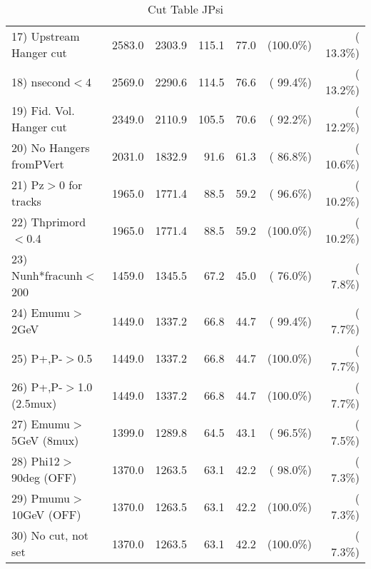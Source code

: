 \begin{table}[h!]
\begin{tabular}{||l||r|r|r|r|r|r||}
 17) Upstream Hanger cut  &       2583.0 &       2303.9 &        115.1 &         77.0 & (100.0\%) & ( 13.3\%) \\
 18) nsecond$<$4          &       2569.0 &       2290.6 &        114.5 &         76.6 & ( 99.4\%) & ( 13.2\%) \\
 19) Fid. Vol. Hanger cut &       2349.0 &       2110.9 &        105.5 &         70.6 & ( 92.2\%) & ( 12.2\%) \\
 20) No Hangers fromPVert &       2031.0 &       1832.9 &         91.6 &         61.3 & ( 86.8\%) & ( 10.6\%) \\
 21) Pz$>$0 for tracks    &       1965.0 &       1771.4 &         88.5 &         59.2 & ( 96.6\%) & ( 10.2\%) \\
 22) Thprimord$<$0.4      &       1965.0 &       1771.4 &         88.5 &         59.2 & (100.0\%) & ( 10.2\%) \\
 23) Nunh*fracunh$<$200   &       1459.0 &       1345.5 &         67.2 &         45.0 & ( 76.0\%) & (  7.8\%) \\
 24) Emumu$>$2GeV         &       1449.0 &       1337.2 &         66.8 &         44.7 & ( 99.4\%) & (  7.7\%) \\
 25) P+,P-$>$0.5          &       1449.0 &       1337.2 &         66.8 &         44.7 & (100.0\%) & (  7.7\%) \\
 26) P+,P-$>$1.0 (2.5mux) &       1449.0 &       1337.2 &         66.8 &         44.7 & (100.0\%) & (  7.7\%) \\
 27) Emumu$>$5GeV  (8mux) &       1399.0 &       1289.8 &         64.5 &         43.1 & ( 96.5\%) & (  7.5\%) \\
 28) Phi12$>$90deg  (OFF) &       1370.0 &       1263.5 &         63.1 &         42.2 & ( 98.0\%) & (  7.3\%) \\
 29) Pmumu$>$10GeV  (OFF) &       1370.0 &       1263.5 &         63.1 &         42.2 & (100.0\%) & (  7.3\%) \\
 30) No cut, not set      &       1370.0 &       1263.5 &         63.1 &         42.2 & (100.0\%) & (  7.3\%) \\
 \hline
 \hline
 \end{tabular}
 \caption{Cut Table  JPsi     }
 \label{tab-cutcohjpsi-mumu_cohrhop}
 \end{table}
